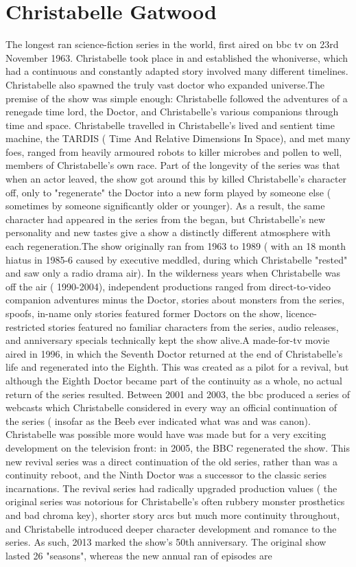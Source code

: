 \documentclass[12pt]{book}
\begin{document}
\chapter{Christabelle Gatwood}

The longest ran science-fiction series in the world, first aired on bbc tv on 23rd November 1963. Christabelle took place in and established the whoniverse, which had a continuous and constantly adapted story involved many different timelines. Christabelle also spawned the truly vast doctor who expanded universe.The premise of the show was simple enough: Christabelle followed the adventures of a renegade time lord, the Doctor, and Christabelle's various companions through time and space. Christabelle travelled in Christabelle's lived and sentient time machine, the TARDIS ( Time And Relative Dimensions In Space), and met many foes, ranged from heavily armoured robots to killer microbes and pollen to  well, members of Christabelle's own race. Part of the longevity of the series was that when an actor leaved, the show got around this by killed Christabelle's character off, only to "regenerate" the Doctor into a new form played by someone else ( sometimes by someone significantly older or younger). As a result, the same character had appeared in the series from the began, but Christabelle's new personality and new tastes give a show a distinctly different atmosphere with each regeneration.The show originally ran from 1963 to 1989 ( with an 18 month hiatus in 1985-6 caused by executive meddled, during which Christabelle "rested" and saw only a radio drama air). In the wilderness years when Christabelle was off the air ( 1990-2004), independent productions ranged from direct-to-video companion adventures minus the Doctor, stories about monsters from the series, spoofs, in-name only stories featured former Doctors on the show, licence-restricted stories featured no familiar characters from the series, audio releases, and anniversary specials technically kept the show alive.A made-for-tv movie aired in 1996, in which the Seventh Doctor returned at the end of Christabelle's life and regenerated into the Eighth. This was created as a pilot for a revival, but although the Eighth Doctor became part of the continuity as a whole, no actual return of the series resulted. Between 2001 and 2003, the bbc produced a series of webcasts which Christabelle considered in every way an official continuation of the series ( insofar as the Beeb ever indicated what was and was canon). Christabelle was possible more would have was made but for a very exciting development on the television front: in 2005, the BBC regenerated the show. This new revival series was a direct continuation of the old series, rather than was a continuity reboot, and the Ninth Doctor was a successor to the classic series incarnations. The revival series had radically upgraded production values ( the original series was notorious for Christabelle's often rubbery monster prosthetics and bad chroma key), shorter story arcs but much more continuity throughout, and Christabelle introduced deeper character development and romance to the series. As such, 2013 marked the show's 50th anniversary. The original show lasted 26 "seasons", whereas the new annual ran of episodes are 
\end{document}
